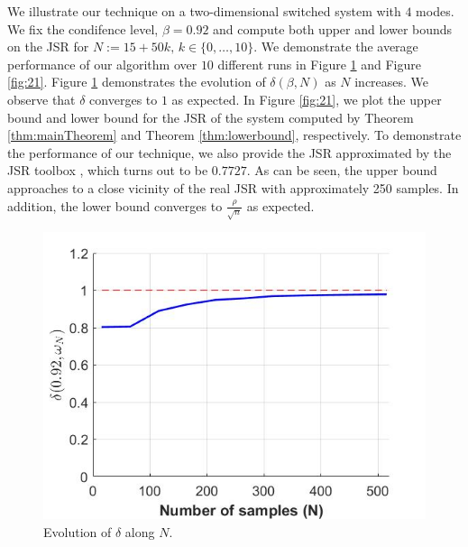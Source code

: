 We illustrate our technique on a two-dimensional switched system with $4$ modes. We fix the condifence level, \mbox{$\beta = 0.92$} and compute both upper and lower bounds on the JSR for $N:=15+50k,\, k \in\{0, \ldots, 10\}.$ We demonstrate the average performance of our algorithm over $10$ different runs in Figure \ref{fig:11} and Figure \ref{fig:21}. Figure \ref{fig:11} demonstrates the evolution of $\delta(\beta, N)$ as $N$ increases. We observe that $\delta$ converges to $1$ as expected. In Figure \ref{fig:21}, we plot the upper bound and lower bound for the JSR of the system computed by Theorem \ref{thm:mainTheorem} and Theorem \ref{thm:lowerbound}, respectively. To demonstrate the performance of our technique, we also provide the JSR approximated by the JSR toolbox \cite{jsrtoolbox}, which turns out to be $0.7727$. As can be seen, the upper bound approaches to a close vicinity of the real JSR with approximately 250 samples. In addition, the lower bound converges to $\frac{\rho}{\sqrt{n}}$ as expected.

\begin{figure}
\begin{center}
\includegraphics[scale=0.35]{delta1.jpg}

\caption{Evolution of $\delta$ along $N$.}
\label{fig:11}
\end{center}
\end{figure}

